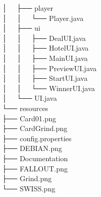 \documentclass[a4paper,12pt]{article}
\begin{document}
	│           ├── player\\
	│           │   └── Player.java\\
	│           ├── ui\\
	│           │   ├── DealUI.java\\
	│           │   ├── HotelUI.java\\
	│           │   ├── MainUI.java\\
	│           │   ├── PreviewUI.java\\
	│           │   ├── StartUI.java\\
	│           │   └── WinnerUI.java\\
	│           └── UI.java\\
	└── resources\\
	├── Card01.png\\
	├── CardGrind.png\\
	├── config.properties\\
	├── DEBIAN.png\\
	├── Documentation\\
	├── FALLOUT.png\\
	├── Grind.png\\
	└── SWISS.png\\
	
\end{document}
